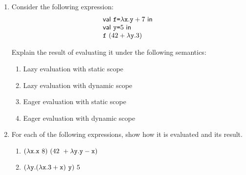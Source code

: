\begin{enumerate}
\item Consider the following expression:
\[
\begin{array}{l}
  \textsf{val}\ \texttt{f}\texttt{=}\lambda\texttt{x}.\texttt{y}+7\ \textsf{in}\ \\
  \textsf{val}\ \texttt{y}\texttt{=}5\ \textsf{in}\ \\
  \texttt{f}\ (42+\lambda\texttt{y}.3)
 
 
\end{array}
\]

Explain the result of evaluating it under the following semantics:
\begin{enumerate}
  \item Lazy evaluation with static scope
  \item Lazy evaluation with dynamic scope
  \item Eager evaluation with static scope
  \item Eager evaluation with dynamic scope
\end{enumerate}

\item For each of the following \lang expressions, show how it is evaluated and its result.

\begin{enumerate}
  \item
    $(\lambda\texttt{x}.\texttt{x}\ 8)\ (42\ +\lambda\texttt{y}.\texttt{y}-\texttt{x})$
  \item
    $(\lambda\texttt{y}.(\lambda\texttt{x}.3+\texttt{x})\ \texttt{y})\ 5$
\end{enumerate}

\end{enumerate}
